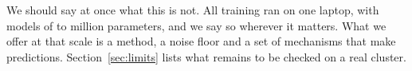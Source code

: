 We should say at once what this is not. All training ran on one laptop, with models of \paramsXS{} to \largeParams{} million
parameters, and we say so wherever it matters. What we offer at that scale is a method, a noise floor and a set of
mechanisms that make predictions. Section~\ref{sec:limits} lists what remains to be checked on a real cluster.
